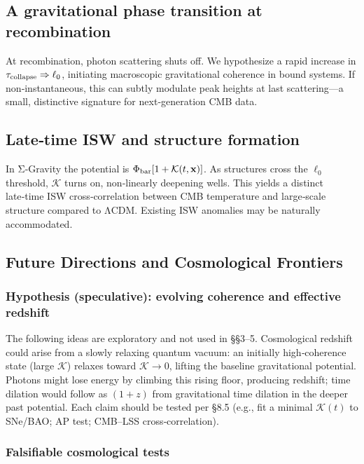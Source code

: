 \documentclass[11pt,a4paper]{article}
\begin{document}
\subsection{A gravitational phase transition at recombination}


At recombination, photon scattering shuts off. We hypothesize a rapid increase in $\allowbreak \tau_{\rm collapse}\Rightarrow\ell_0$\allowbreak , initiating macroscopic gravitational coherence in bound systems. If non‑instantaneous, this can subtly modulate peak heights at last scattering—a small, distinctive signature for next‑generation CMB data.


\subsection{Late‑time ISW and structure formation}


In Σ‑Gravity the potential is $\allowbreak \Phi_{\rm bar}[1+\mathcal{K}(t,\mathbf{x})]$\allowbreak . As structures cross the $\ell_0$ threshold, $\mathcal{K}$ turns on, non‑linearly deepening wells. This yields a distinct late‑time ISW cross‑correlation between CMB temperature and large‑scale structure compared to ΛCDM. Existing ISW anomalies may be naturally accommodated.


\subsection{Future Directions and Cosmological Frontiers}


\subsubsection{Hypothesis (speculative): evolving coherence and effective redshift}


The following ideas are exploratory and not used in §§3–5. Cosmological redshift could arise from a slowly relaxing quantum vacuum: an initially high‑coherence state (large $\mathcal{K}$) relaxes toward $\mathcal{K}\to0$, lifting the baseline gravitational potential. Photons might lose energy by climbing this rising floor, producing redshift; time dilation would follow as $(1+z)$ from gravitational time dilation in the deeper past potential. Each claim should be tested per §8.5 (e.g., fit a minimal $\mathcal{K}(t)$ to SNe/BAO; AP test; CMB–LSS cross‑correlation).


\subsubsection{Falsifiable cosmological tests}
\end{document}
